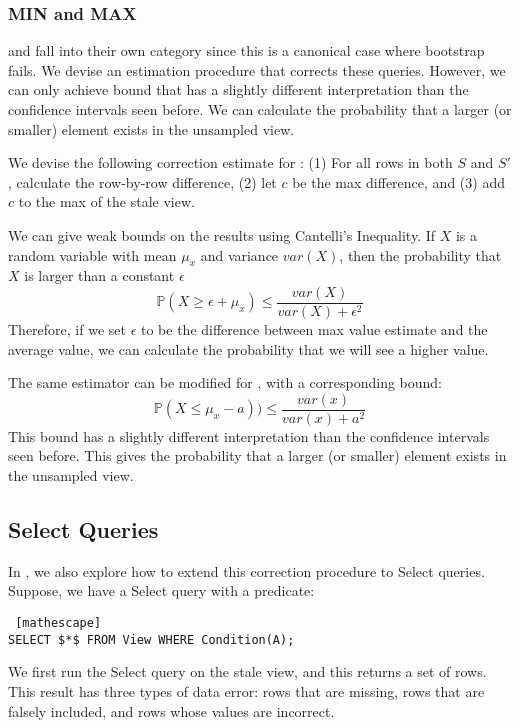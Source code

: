 \subsubsection{MIN and MAX}
\minfunc and \maxfunc fall into their own category since this is a canonical case where bootstrap fails.
We devise an estimation procedure that corrects these queries.
However, we can only achieve bound that has a slightly different interpretation than the confidence intervals seen before.
We can calculate the probability that a larger (or smaller) element exists in the unsampled view.

We devise the following correction estimate for \maxfunc: (1) For all rows in both $S$ and $S'$, calculate the row-by-row difference, (2) let $c$ be the max difference, and (3) add $c$ to the max of the stale view.

We can give weak bounds on the results using Cantelli's Inequality.
If $X$ is a random variable with mean $\mu_x$ and variance $var(X)$, then the probability that $X$ is larger than a constant $\epsilon$ 
\[
\mathbb{P}(X \ge \epsilon + \mu_x ) \le \frac{var(X)}{var(X) + \epsilon^2}
\]
Therefore, if we set $\epsilon$ to be the difference between max value estimate and the average value, we can calculate the probability that we will see a higher value. 

The same estimator can be modified for \minfunc, with a corresponding bound:
\[
\mathbb{P}(X \le \mu_x - a )) \le \frac{var(x)}{var(x) + a^2}
\]
This bound has a slightly different interpretation than the confidence intervals seen before.
This gives the probability that a larger (or smaller) element exists in the unsampled view.


\vspace{-.25em}
\subsection{Select Queries}
In \svc, we also explore how to extend this correction procedure to Select queries.
Suppose, we have a Select query with a predicate:
\begin{lstlisting} [mathescape]
SELECT $*$ FROM View WHERE Condition(A);
\end{lstlisting}

We first run the Select query on the stale view, and this returns a set of rows.
This result has three types of data error: rows that are missing, rows that are falsely included, and rows whose values are incorrect.

